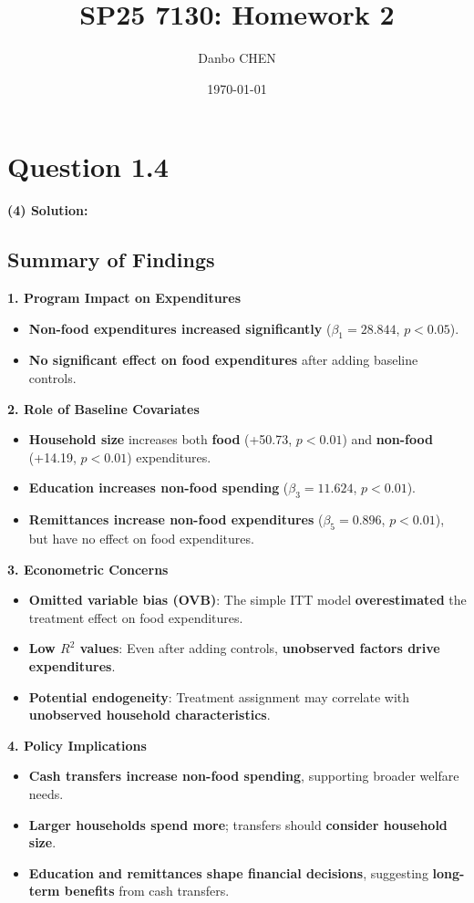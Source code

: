 \documentclass[12pt, oneside]{article}
\title{SP25 7130: Homework 2}
\author{Danbo CHEN}
\date{\today}
\begin{document}
\maketitle
\vspace{.25in}

\section{Question 1.4}
\textbf{(4) Solution:}
\subsection{Summary of Findings}
\textbf{1. Program Impact on Expenditures}  
\begin{itemize}
    \item \textbf{Non-food expenditures increased significantly} ($\beta_1 = 28.844$, $p < 0.05$).
    \item \textbf{No significant effect on food expenditures} after adding baseline controls.
\end{itemize}

\textbf{2. Role of Baseline Covariates}  
\begin{itemize}
    \item \textbf{Household size} increases both \textbf{food} (+50.73, $p < 0.01$) and \textbf{non-food} (+14.19, $p < 0.01$) expenditures.
    \item \textbf{Education increases non-food spending} ($\beta_3 = 11.624$, $p < 0.01$).
    \item \textbf{Remittances increase non-food expenditures} ($\beta_5 = 0.896$, $p < 0.01$), but have no effect on food expenditures.
\end{itemize}

\textbf{3. Econometric Concerns}  
\begin{itemize}
    \item \textbf{Omitted variable bias (OVB)}: The simple ITT model \textbf{overestimated} the treatment effect on food expenditures.
    \item \textbf{Low $R^2$ values}: Even after adding controls, \textbf{unobserved factors drive expenditures}.
    \item \textbf{Potential endogeneity}: Treatment assignment may correlate with \textbf{unobserved household characteristics}.
\end{itemize}

\textbf{4. Policy Implications}  
\begin{itemize}
    \item \textbf{Cash transfers increase non-food spending}, supporting broader welfare needs.
    \item \textbf{Larger households spend more}; transfers should \textbf{consider household size}.
    \item \textbf{Education and remittances shape financial decisions}, suggesting \textbf{long-term benefits} from cash transfers.
\end{itemize}
\end{document}
